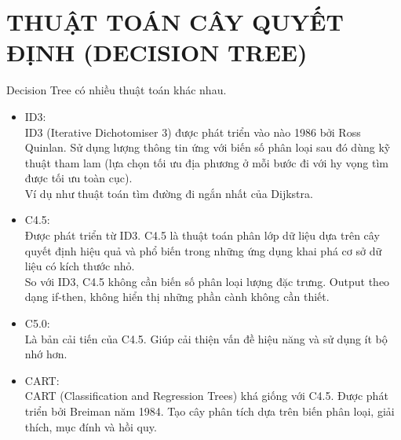 \chapter{THUẬT TOÁN CÂY QUYẾT ĐỊNH (DECISION TREE)}

Decision Tree có nhiều thuật toán khác nhau.

\begin{itemize}
    \item ID3:\\
    ID3 (Iterative Dichotomiser 3) được phát triển vào nào 1986 bởi Ross Quinlan. Sử dụng lượng thông tin ứng với biến số phân loại sau đó dùng kỹ thuật tham lam (lựa chọn tối ưu địa phương ở mỗi bước đi với hy vọng tìm được tối ưu toàn cục).\\
    Ví dụ như thuật toán tìm đường đi ngắn nhất của Dijkstra.
    \item C4.5:\\
    Được phát triển từ ID3. C4.5 là thuật toán phân lớp dữ liệu dựa trên cây quyết định hiệu quả và phổ biến trong những ứng dụng khai phá cơ sở dữ liệu có kích thước nhỏ.\\
    So với ID3, C4.5 không cần biến số phân loại lượng đặc trưng. Output theo dạng if-then, không hiển thị những phần cành không cần thiết.
    \item C5.0:\\
    Là bản cải tiến của C4.5. Giúp cải thiện vấn đề hiệu năng và sử dụng ít bộ nhớ hơn.
    \item CART:\\
    CART (Classification and Regression Trees) khá giống với C4.5. Được phát triển bởi Breiman năm 1984. Tạo cây phân tích dựa trên biến phân loại, giải thích, mục đính và hồi quy.
\end{itemize}
